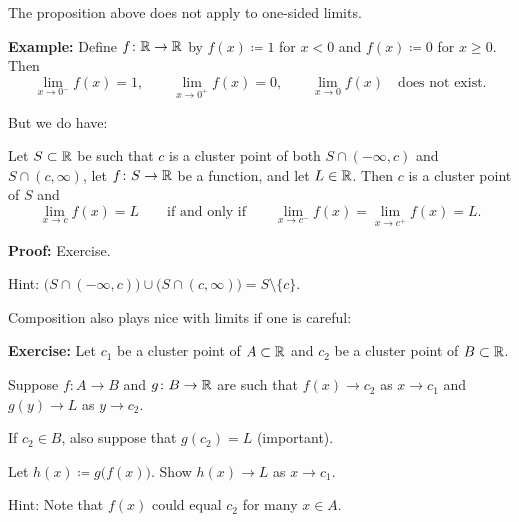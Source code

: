\documentclass[10pt,aspectratio=169]{beamer}
\begin{document}
\begin{frame}

The proposition above does not apply to one-sided limits.

\pause
\medskip

\textbf{Example:}
Define $f \colon {\mathbb{R}} \to {\mathbb{R}}$ by $f(x) \coloneqq 1$ for $x < 0$ and
$f(x) \coloneqq 0$ for $x \geq 0$. Then
\begin{equation*}
\lim_{x \to 0^-} f(x) = 1, \qquad
\lim_{x \to 0^+} f(x) = 0, \qquad
\lim_{x \to 0} f(x) \quad \text{does not exist.}
\end{equation*}

\pause
\medskip

But we do have:

\begin{proposition}
Let $S \subset {\mathbb{R}}$ be such that $c$ is a cluster point
of both $S \cap (-\infty,c)$ and $S \cap (c,\infty)$, let
$f \colon S \to {\mathbb{R}}$ be a function, and let $L \in {\mathbb{R}}$.
\pause
Then $c$ is a cluster point of $S$ and
\begin{equation*}
\lim_{x \to c} f(x) = L
\qquad \text{if and only if} \qquad
\lim_{x \to c^-} f(x) =
\lim_{x \to c^+} f(x) =
L .
\end{equation*}
\end{proposition}

\pause
\textbf{Proof:} Exercise.

\pause
\medskip

Hint:
$\bigl( S \cap (-\infty,c) \bigr) \cup \bigl( S \cap (c,\infty) \bigr)
= S \setminus \{ c \}$.
\end{frame}

\begin{frame}
Composition also plays nice with limits if one is careful:

\pause
\medskip

\textbf{Exercise:}
Let $c_1$ be a cluster point of $A \subset {\mathbb{R}}$ and $c_2$ be a cluster point of $B \subset {\mathbb{R}}$.

\pause
Suppose $f \colon A \to B$ and $g \colon B \to {\mathbb{R}}$ are
such that $f(x) \to c_2$ as $x \to c_1$ and
$g(y) \to L$ as $y \to c_2$.

\pause
If $c_2 \in B$, also suppose that $g(c_2) = L$ (important).

\pause
Let $h(x) \coloneqq g\bigl(f(x)\bigr)$.  Show
$h(x) \to L$ as $x \to c_1$.

\pause
\medskip

Hint: Note that $f(x)$ could equal $c_2$ for many $x \in A$.
\end{frame}
\end{document}
